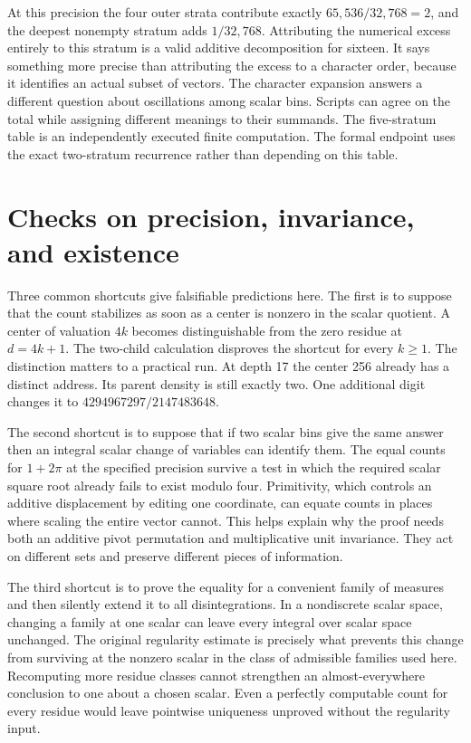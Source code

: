 \documentclass[12pt,letterpaper]{article}
\begin{document}
At this precision the four outer strata contribute exactly $65{,}536/32{,}768=2$, and the deepest nonempty stratum adds $1/32{,}768$. Attributing the numerical excess entirely to this stratum is a valid additive decomposition for sixteen. It says something more precise than attributing the excess to a character order, because it identifies an actual subset of vectors. The character expansion answers a different question about oscillations among scalar bins. Scripts can agree on the total while assigning different meanings to their summands. The five-stratum table is an independently executed finite computation. The formal endpoint uses the exact two-stratum recurrence rather than depending on this table.

\section{Checks on precision, invariance, and existence}
Three common shortcuts give falsifiable predictions here. The first is to suppose that the count stabilizes as soon as a center is nonzero in the scalar quotient. A center of valuation $4k$ becomes distinguishable from the zero residue at $d=4k+1$. The two-child calculation disproves the shortcut for every $k\ge1$. The distinction matters to a practical run. At depth 17 the center 256 already has a distinct address. Its parent density is still exactly two. One additional digit changes it to $4294967297/2147483648$.

The second shortcut is to suppose that if two scalar bins give the same answer then an integral scalar change of variables can identify them. The equal counts for $1+2\pi$ at the specified precision survive a test in which the required scalar square root already fails to exist modulo four. Primitivity, which controls an additive displacement by editing one coordinate, can equate counts in places where scaling the entire vector cannot. This helps explain why the proof needs both an additive pivot permutation and multiplicative unit invariance. They act on different sets and preserve different pieces of information.

The third shortcut is to prove the equality for a convenient family of measures and then silently extend it to all disintegrations. In a nondiscrete scalar space, changing a family at one scalar can leave every integral over scalar space unchanged. The original regularity estimate is precisely what prevents this change from surviving at the nonzero scalar in the class of admissible families used here. Recomputing more residue classes cannot strengthen an almost-everywhere conclusion to one about a chosen scalar. Even a perfectly computable count for every residue would leave pointwise uniqueness unproved without the regularity input.
\end{document}
